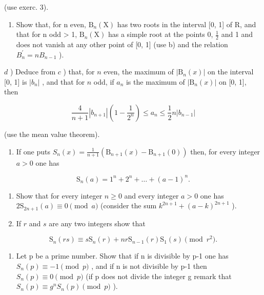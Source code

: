 (use exerc. 3).

\begin{enumerate}
\def\labelenumi{\alph{enumi})}
\setcounter{enumi}{2}
\tightlist
\item
  Show that, for n even, \(\mathrm{B}_{n}(\mathrm{X})\) has two roots in the interval {[}0, 1{]} of R, and that for n odd \textgreater{} 1, \(\mathrm{B}_{n}(\mathrm{X})\) has a simple root at the points 0, \(\frac{1}{2}\) and 1 and does not vanish at any other point of {[}0, 1{]} (use b) and the relation \(B_{n}^{\prime}=nB_{n-1}\) ).
\end{enumerate}

\(d\) ) Deduce from \(c\) ) that, for \(n\) even, the maximum of \(|\mathrm{B}_n(x)|\) on the interval {[}0, 1{]} is \(|b_n|\) , and that for \(n\) odd, if \(a_{n}\) is the maximum of \(|\mathrm{B}_n(x)|\) on {[}0, 1{]}, then

\[
\frac {4}{n + 1} \left| b _ {n + 1} \right| \left(1 - \frac {1}{2 ^ {n}}\right) \leqslant a _ {n} \leqslant \frac {1}{2} n \left| b _ {n - 1} \right|
\]

(use the mean value theorem).

\begin{enumerate}
\def\labelenumi{\arabic{enumi})}
\setcounter{enumi}{4}
\tightlist
\item
  If one puts \(S_{n}(x) = \frac{1}{n + 1} (\mathrm{B}_{n + 1}(x) - \mathrm{B}_{n + 1}(0))\) then, for every integer \(a > 0\) one has
\end{enumerate}

\[
\mathrm{S} _ {n} (a) = 1 ^ {n} + 2 ^ {n} + \dots + (a - 1) ^ {n}.
\]

\begin{enumerate}
\def\labelenumi{\alph{enumi})}
\item
  Show that for every integer \(n \geqslant 0\) and every integer \(a > 0\) one has \(2\mathrm{S}_{2n + 1}(a) \equiv 0 \pmod{a}\) (consider the sum \(k^{2n + 1} + (a - k)^{2n + 1}\) ).
\item
  If \(r\) and \(s\) are any two integers show that
\end{enumerate}

\[
\mathrm{S} _ {n} (r s) \equiv s \mathrm{S} _ {n} (r) + n r \mathrm{S} _ {n - 1} (r) \mathrm{S} _ {1} (s) \pmod {r ^ {2}}.
\]

\begin{enumerate}
\def\labelenumi{\alph{enumi})}
\setcounter{enumi}{2}
\tightlist
\item
  Let p be a prime number. Show that if n is divisible by p-1 one has \(S_{n}(p) \equiv -1 \pmod{p}\) , and if n is not divisible by p-1 then \(S_{n}(p) \equiv 0 \pmod{p}\) (if p does not divide the integer g remark that \(S_{n}(p) \equiv g^{n}S_{n}(p) \pmod{p}\) ).
\end{enumerate}

